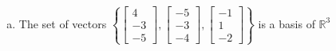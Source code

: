 \begin{exerciseAnswer}
\begin{enumerate}[(a)]
\item The set of vectors \( \left\{ \left[\begin{array}{c}
4 \\
-3 \\
-5
\end{array}\right] , \left[\begin{array}{c}
-5 \\
-3 \\
-4
\end{array}\right] , \left[\begin{array}{c}
-1 \\
1 \\
-2
\end{array}\right] \right\} \) is a basis of \(\mathbb{R}^3\)
\end{enumerate}
    
\end{exerciseAnswer}
    
